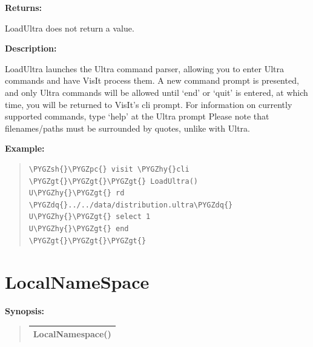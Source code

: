 \documentclass[letterpaper,10pt,english]{sphinxmanual}
\def\PYGZgt{\char`\>}
\def\PYGZsh{\char`\#}
\def\PYGZpc{\char`\%}
\def\PYGZhy{\char`\-}
\def\PYGZdq{\char`\"}
\begin{document}
\begin{DUlineblock}{0em}
\item[] 
\item[] \textbf{Returns:}
\item[] LoadUltra does not return a value.
\item[] 
\item[] \textbf{Description:}
\item[] LoadUltra launches the Ultra command parser, allowing you to enter Ultra
commands and have VisIt process them.  A new command prompt is presented,
and only Ultra commands will be allowed until `end' or `quit' is entered,
at which time, you will be returned to VisIt's cli prompt.  For information
on currently supported commands, type `help' at the Ultra prompt
Please note that filenames/paths must be surrounded by quotes, unlike with
Ultra.
\end{DUlineblock}

\begin{DUlineblock}{0em}
\item[] 
\end{DUlineblock}

\begin{DUlineblock}{0em}
\item[] \textbf{Example:}
\item[] 
\end{DUlineblock}
\begin{quote}

\begin{Verbatim}[commandchars=\\\{\}]
\PYGZsh{}\PYGZpc{} visit \PYGZhy{}cli
\PYGZgt{}\PYGZgt{}\PYGZgt{} LoadUltra()
U\PYGZhy{}\PYGZgt{} rd \PYGZdq{}../../data/distribution.ultra\PYGZdq{}
U\PYGZhy{}\PYGZgt{} select 1
U\PYGZhy{}\PYGZgt{} end
\PYGZgt{}\PYGZgt{}\PYGZgt{}
\end{Verbatim}
\end{quote}


\section{LocalNameSpace}
\label{functions:localnamespace}
\begin{DUlineblock}{0em}
\item[] \textbf{Synopsis:}
\end{DUlineblock}
\begin{quote}

\begin{tabulary}{\linewidth}{|L|}
\hline

LocalNamespace()
\\
\hline\end{tabulary}

\end{quote}
\end{document}
